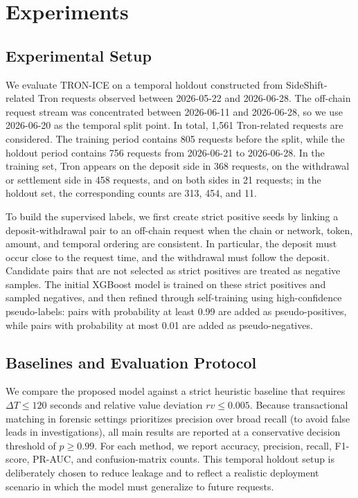 \documentclass[journal]{IEEEtran}
\begin{document}
    
    
    \section{Experiments}
    \label{sec:experiments}
    
    \subsection{Experimental Setup}
    
    We evaluate TRON-ICE on a temporal holdout constructed from SideShift-related Tron requests observed between 2026-05-22 and 2026-06-28. The off-chain request stream was concentrated between 2026-06-11 and 2026-06-28, so we use 2026-06-20 as the temporal split point. In total, 1,561 Tron-related requests are considered. The training period contains 805 requests before the split, while the holdout period contains 756 requests from 2026-06-21 to 2026-06-28. In the training set, Tron appears on the deposit side in 368 requests, on the withdrawal or settlement side in 458 requests, and on both sides in 21 requests; in the holdout set, the corresponding counts are 313, 454, and 11.
    
    To build the supervised labels, we first create strict positive seeds by linking a deposit-withdrawal pair to an off-chain request when the chain or network, token, amount, and temporal ordering are consistent. In particular, the deposit must occur close to the request time, and the withdrawal must follow the deposit. Candidate pairs that are not selected as strict positives are treated as negative samples. The initial XGBoost model is trained on these strict positives and sampled negatives, and then refined through self-training using high-confidence pseudo-labels: pairs with probability at least 0.99 are added as pseudo-positives, while pairs with probability at most 0.01 are added as pseudo-negatives.
    
    \subsection{Baselines and Evaluation Protocol}
    
    We compare the proposed model against a strict heuristic baseline that requires $\Delta T \le 120$ seconds and relative value deviation $rv \le 0.005$. Because transactional matching in forensic settings prioritizes precision over broad recall (to avoid false leads in investigations), all main results are reported at a conservative decision threshold of $p \ge 0.99$. For each method, we report accuracy, precision, recall, F1-score, PR-AUC, and confusion-matrix counts. This temporal holdout setup is deliberately chosen to reduce leakage and to reflect a realistic deployment scenario in which the model must generalize to future requests.
    
\end{document}
